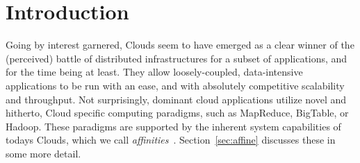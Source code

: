 \documentclass{article}
\newcommand{\I}[1]{\textit{#1}}
\newcommand{\up}{\vspace*{-1em}}
\begin{document}

% 
% 
% 
% 
% 
% 
% 
% 
% 


\up
\section{Introduction}

Going by interest garnered, Clouds seem to have emerged as a clear
winner of the (perceived) battle of distributed infrastructures for a
subset of applications, and for the time being at least.  They allow
loosely-coupled, data-intensive applications to be run with an ease,
and with absolutely competitive scalability and throughput.  Not
surprisingly, dominant cloud applications utilize novel and hitherto,
Cloud specific computing paradigms, such as MapReduce, BigTable, or
Hadoop.  These paradigms are supported by the inherent system
capabilities of todays Clouds, which we call
\I{affinities}~\cite{cloud-saga-paper}.  Section~\ref{sec:affine}
discusses these in some more detail.
\end{document}
